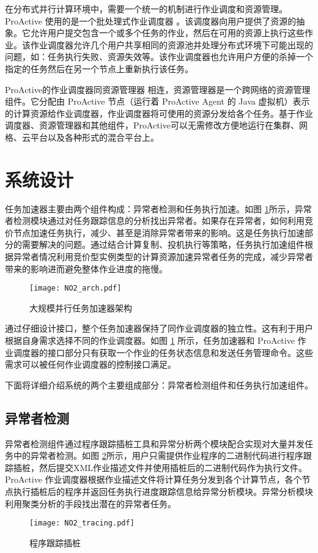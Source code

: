 在分布式并行计算环境中，需要一个统一的机制进行作业调度和资源管理。ProActive 使用的是一个批处理式作业调度器 \cite{pascheduling}。该调度器向用户提供了资源的抽象。它允许用户提交包含一个或多个任务的作业，然后在可用的资源上执行这些作业。该作业调度器允许几个用户共享相同的资源池并处理分布式环境下可能出现的问题，如：任务执行失败、资源失效等。该作业调度器也允许用户方便的杀掉一个指定的任务然后在另一个节点上重新执行该任务。

ProActive的作业调度器同资源管理器 \cite{parm} 相连，资源管理器是一个跨网络的资源管理组件。它分配由 ProActive 节点（运行着 ProActive Agent 的 Java 虚拟机）表示的计算资源给作业调度器，作业调度器将可使用的资源分发给各个任务。基于作业调度器、资源管理器和其他组件，ProActive可以无需修改方便地运行在集群、网格、云平台以及各种形式的混合平台上。

\section{系统设计}
\label{sec:no2}
任务加速器主要由两个组件构成：异常者检测和任务执行加速。如图 \ref{figure:no2arch}所示，异常者检测模块通过对任务跟踪信息的分析找出异常者。如果存在异常者，如何利用竞价节点加速任务执行，减少、甚至是消除异常者带来的影响。这是任务执行加速部分的需要解决的问题。通过结合计算复制、投机执行等策略，任务执行加速组件根据异常者情况利用竞价型实例类型的计算资源加速异常者任务的完成，减少异常者带来的影响进而避免整体作业进度的拖慢。
\begin{figure}
  \centering
  \texttt{[image: NO2\_arch.pdf]}
  \caption{大规模并行任务加速器架构}
  \label{figure:no2arch}
\end{figure}

通过仔细设计接口，整个任务加速器保持了同作业调度器的独立性。这有利于用户根据自身需求选择不同的作业调度器。如图 \ref{figure:no2arch} 所示，任务加速器和 ProActive 作业调度器的接口部分只有获取一个作业的任务状态信息和发送任务管理命令。这些需求可以被任何作业调度器的控制接口满足。

下面将详细介绍系统的两个主要组成部分：异常者检测组件和任务执行加速组件。

\subsection{异常者检测}
\label{subsec:no2_trace}
异常者检测组件通过程序跟踪插桩工具和异常分析两个模块配合实现对大量并发任务中的异常者检测。如图 \ref{figure:tracing}所示，用户只需提供作业程序的二进制代码进行程序跟踪插桩，然后提交XML作业描述文件并使用插桩后的二进制代码作为执行文件。ProActive 作业调度器根据作业描述文件将计算任务分发到各个计算节点，各个节点执行插桩后的程序并返回任务执行进度跟踪信息给异常分析模块。异常分析模块利用聚类分析的手段找出潜在的异常者任务。
\begin{figure}
  \centering
  \texttt{[image: NO2\_tracing.pdf]}
  \caption{程序跟踪插桩}
  \label{figure:tracing}
\end{figure}

